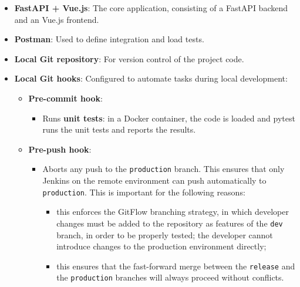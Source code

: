 \begin{itemize}
    \item \textbf{FastAPI + Vue.js}: The core application, consisting of a FastAPI backend and an Vue.js frontend.
    \item \textbf{Postman}: Used to define integration and load tests.
    \item \textbf{Local Git repository}: For version control of the project code.
    \item \textbf{Local Git hooks}: Configured to automate tasks during local development:
    \begin{itemize}
        \item \textbf{Pre-commit hook}:
        \begin{itemize}
            \item Runs \textbf{unit tests}: in a Docker container, the code is loaded and pytest runs the unit tests and reports the results.
        \end{itemize}
        \item \textbf{Pre-push hook}:
        \begin{itemize}
            \item Aborts any push to the \texttt{production} branch. This ensures that only Jenkins on the remote environment can push automatically to \texttt{production}. This is important for the following reasons:
            \begin{itemize}
                \item this enforces the GitFlow branching strategy, in which developer changes must be added to the repository as features of the \texttt{dev} branch, in order to be properly tested; the developer cannot introduce changes to the production environment directly;
                \item this ensures that the fast-forward merge between the \texttt{release} and the \texttt{production} branches will always proceed without conflicts.
            \end{itemize}
        \end{itemize}
    \end{itemize}
\end{itemize}

